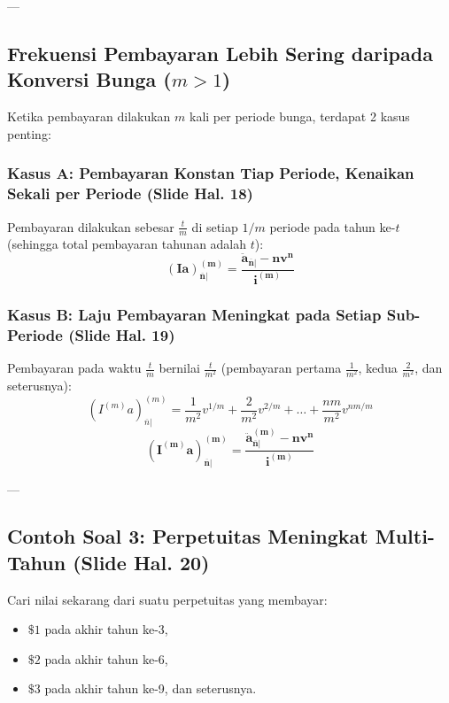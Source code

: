 \documentclass[11pt,a4paper]{article}
\begin{document}
---

\subsection{Frekuensi Pembayaran Lebih Sering daripada Konversi Bunga (\texorpdfstring{$m > 1$}{m > 1})}

Ketika pembayaran dilakukan $m$ kali per periode bunga, terdapat 2 kasus penting:

\subsubsection{Kasus A: Pembayaran Konstan Tiap Periode, Kenaikan Sekali per Periode (Slide Hal. 18)}
Pembayaran dilakukan sebesar $\frac{t}{m}$ di setiap $1/m$ periode pada tahun ke-$t$ (sehingga total pembayaran tahunan adalah $t$):
\begin{equation}
    \mathbf{(Ia)_{\overline{n}|}^{(m)} = \frac{\ddot{a}_{\overline{n}|} - n v^n}{i^{(m)}}}
\end{equation}

\subsubsection{Kasus B: Laju Pembayaran Meningkat pada Setiap Sub-Periode (Slide Hal. 19)}
Pembayaran pada waktu $\frac{t}{m}$ bernilai $\frac{t}{m^2}$ (pembayaran pertama $\frac{1}{m^2}$, kedua $\frac{2}{m^2}$, dan seterusnya):
\begin{equation}
    (I^{(m)} a)_{\overline{n}|}^{(m)} = \frac{1}{m^2} v^{1/m} + \frac{2}{m^2} v^{2/m} + \dots + \frac{nm}{m^2} v^{nm/m}
\end{equation}
\begin{equation}
    \mathbf{(I^{(m)} a)_{\overline{n}|}^{(m)} = \frac{\ddot{a}_{\overline{n}|}^{(m)} - n v^n}{i^{(m)}}}
\end{equation}

---

\subsection{Contoh Soal 3: Perpetuitas Meningkat Multi-Tahun (Slide Hal. 20)}

\begin{examplebox}
Cari nilai sekarang dari suatu perpetuitas yang membayar:
\begin{itemize}
    \item $\$1$ pada akhir tahun ke-3,
    \item $\$2$ pada akhir tahun ke-6,
    \item $\$3$ pada akhir tahun ke-9, dan seterusnya.
\end{itemize}
\end{examplebox}
\end{document}
